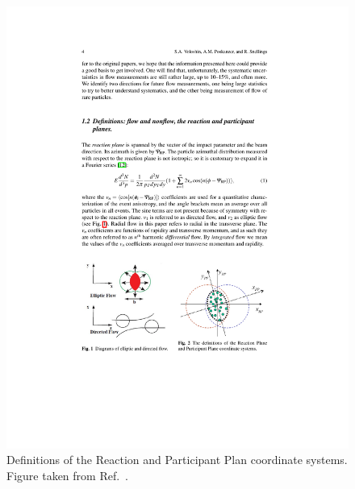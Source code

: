 \begin{figure}
\begin{center}
  \begin{minipage}[b]{0.4\textwidth}
\includegraphics[width=\textwidth]{figures/theory/reaction_plane}
\caption{Definitions of the Reaction and Participant Plan coordinate systems.
Figure taken from Ref.~\cite{Voloshin:2008dg}.}
\label{fig:reaction_plane}
  \end{minipage}
 \qquad  \qquad  \qquad
  \begin{minipage}[b]{0.4\textwidth}

\end{minipage}
\end{center}
\end{figure}
